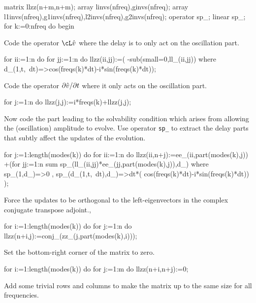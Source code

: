 \documentclass[11pt,a5paper]{article}
\begin{document}
\begin{reduce}
matrix llzz(n+m,n+m);
array linvs(nfreq),ginvs(nfreq);
array l1invs(nfreq),g1invs(nfreq),l2invs(nfreq),g2invs(nfreq);
operator sp_; linear sp_;
for k:=0:nfreq do begin
\end{reduce}

Code the operator \(\cL\hat v\) where the delay is to only act on the oscillation part.

\begin{reduce}
  for ii:=1:n do for jj:=1:n do llzz(ii,jj):=(
      -sub(small=0,ll_(ii,jj))
      where d_(1,t,~dt)=>cos(freqs(k)*dt)-i*sin(freqs(k)*dt));
\end{reduce}

Code the operator \(\D t{\hat v}\) where it only acts on the oscillation part.

\begin{reduce}
  for j:=1:n do llzz(j,j):=i*freqs(k)+llzz(j,j);
\end{reduce}

Now code the part leading to the solvability condition which arises from allowing the (oscillation) amplitude to evolve.
Use operator \verb|sp_| to extract the delay parts that subtly affect the updates of the evolution.

\begin{reduce}
  for j:=1:length(modes(k)) do 
    for ii:=1:n do llzz(ii,n+j):=ee_(ii,part(modes(k),j))
     +(for jj:=1:n sum 
       sp_(ll_(ii,jj)*ee_(jj,part(modes(k),j)),d_)
       where { sp_(1,d_)=>0
             , sp_(d_(1,t,~dt),d_)=>dt*(
               cos(freqs(k)*dt)-i*sin(freqs(k)*dt))
             });
\end{reduce}

Force the updates to be orthogonal to the left-eigenvectors in the complex conjugate transpose adjoint.,

\begin{reduce}
  for i:=1:length(modes(k)) do 
    for j:=1:n do llzz(n+i,j):=conj_(zz_(j,part(modes(k),i)));
\end{reduce}

Set the bottom-right corner of the matrix to zero.

\begin{reduce}
  for i:=1:length(modes(k)) do 
    for j:=1:m do llzz(n+i,n+j):=0;
\end{reduce}

Add some trivial rows and columns to make the matrix up to the same size for all frequencies.
\end{document}
